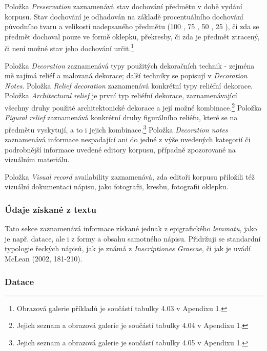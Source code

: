 \startitemize
\item
  \startblockquote
  Položka {\em Preservation} zaznamenává stav dochování předmětu v době vydání korpusu. Stav dochování je odhadován na základě procentuálního dochování původního tvaru a velikosti nadepsaného předmětu (100 , 75 , 50 , 25 ), či zda se předmět dochoval pouze ve formě oklepku, překresby, či zda je předmět ztracený, či není možné stav jeho dochování určit.\footnote{Obrazová galerie příkladů je součástí tabulky 4.03 v Apendixu 1.}
  \stopblockquote
\item
  \startblockquote
  Položka {\em Decoration} zaznamenává typy použitých dekoračních technik - zejména mě zajímá reliéf a malovaná dekorace; další techniky se popisují v {\em Decoration Notes}. Položka {\em Relief decoration} zaznamenává konkrétní typy reliéfní dekorace. Položka {\em Architectural relief} je první typ reliéfní dekorace, zaznamenávající všechny druhy použité architektonické dekorace a její možné kombinace.\footnote{Jejich seznam a obrazová galerie je součástí tabulky 4.04 v Apendixu 1.} Položka {\em Figural relief} zaznamenává konkrétní druhy figurálního reliéfu, které se na předmětu vyskytují, a to i jejich kombinace.\footnote{Jejich seznam a obrazová galerie je součástí tabulky 4.05 v Apendixu 1.} Položka {\em Decoration notes} zaznamenává informace nespadající ani do jedné z výše uvedených kategorií či podrobnější informace uvedené editory korpusu, případně zpozorované na vizuálním materiálu.
  \stopblockquote
\item
  \startblockquote
  Položka {\em Visual record} availability zaznamenává, zda editoři korpusu přiložili též vizuální dokumentaci nápisu, jako fotografii, kresbu, fotografii oklepku.
  \stopblockquote
\stopitemize

\subsubsection[údaje-získané-z-textu]{Údaje získané z textu}

Tato sekce zaznamenává informace získané jednak z epigrafického {\em lemmatu}, jako je např. datace, ale i z formy a obsahu samotného nápisu. Přidržuji se standardní typologie řeckých nápisů, jak je známá z {\em Inscriptiones Graecae}, či jak je uvádí McLean (2002, 181-210).

\subsubsection[datace]{Datace}

